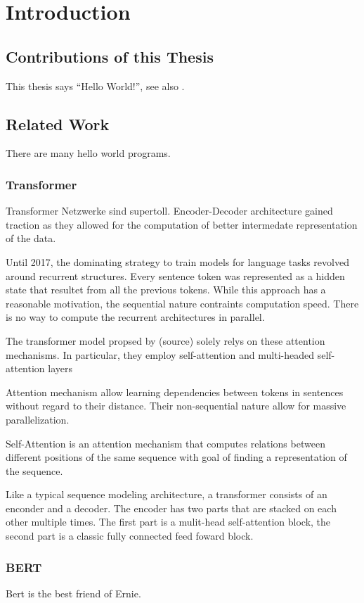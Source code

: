 \documentclass[english, version-2022-01]{uzl-thesis}
\begin{document}
\chapter{Introduction}
\section{Contributions of this Thesis}
This thesis says ``Hello World!'', see also \cite{Kernighan1974}.
\section{Related Work}
There are many hello world programs.

\subsection{Transformer}
Transformer Netzwerke sind supertoll. Encoder-Decoder architecture gained traction as they allowed for the computation of better intermedate representation of the data.

Until 2017, the dominating strategy to train models for language tasks revolved around recurrent structures. Every sentence token was represented as a hidden state that resultet from all the previous tokens. While this approach has a reasonable motivation, the sequential nature contraints computation speed. There is no way to compute the recurrent architectures in parallel.

The transformer model propsed by (source) solely relys on these attention mechanisms. In particular, they employ self-attention and multi-headed self-attention layers

Attention mechanism allow learning dependencies between tokens in sentences without regard to their distance. Their non-sequential nature allow for massive parallelization.

Self-Attention is an attention mechanism that computes relations between different positions of the same sequence with goal of finding a representation of the sequence.

Like a typical sequence modeling architecture, a transformer consists of an enconder and a decoder. The encoder has two parts that are stacked on each other multiple times. The first part is a mulit-head self-attention block, the second part is a classic fully connected feed foward block.


\subsection{BERT}
Bert is the best friend of Ernie.
\end{document}
